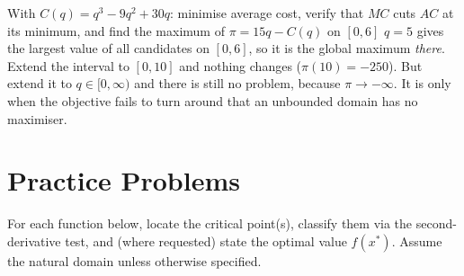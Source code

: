 \begin{worked}{With $C(q)=q^{3}-9q^{2}+30q$: minimise average cost, verify that $MC$ cuts $AC$ at its minimum, and find the maximum of $\pi=15q-C(q)$ on $[0,6]$}
$q=5$ gives the largest value of all candidates on $[0,6]$, so it is the global maximum
\emph{there}. Extend the interval to $[0,10]$ and nothing changes
($\pi(10)=-250$). But extend it to $q\in[0,\infty)$ and there is still no
problem, because $\pi\to-\infty$. It is only when the objective fails to
turn around that an unbounded domain has no maximiser.
\end{worked}

\section{Practice Problems}

For each function below, locate the critical point(s), classify them via
the second-derivative test, and (where requested) state the optimal value
$f(x^*)$. Assume the natural domain unless otherwise specified.

